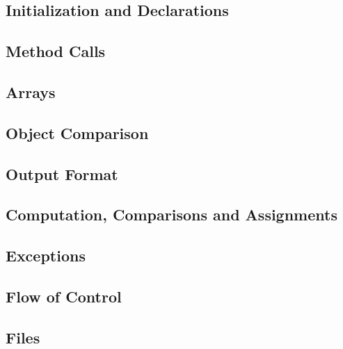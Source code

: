 \subsection{Initialization and Declarations}
	


\subsection{Method Calls}
	


\subsection{Arrays}
	


\subsection{Object Comparison}
	


\subsection{Output Format}
	


\subsection{Computation, Comparisons and Assignments}
	


\subsection{Exceptions}
	


\subsection{Flow of Control}
	


\subsection{Files}
	

